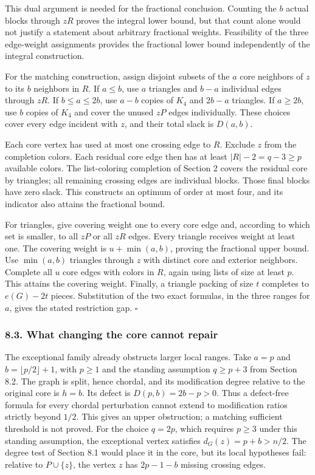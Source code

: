 \documentclass[english,11pt,a4paper]{article}
\begin{document}
This dual argument is needed for the fractional conclusion. Counting the
\(b\) actual blocks through \(zR\) proves the integral lower bound, but
that count alone would not justify a statement about arbitrary
fractional weights. Feasibility of the three edge-weight assignments
provides the fractional lower bound independently of the integral
construction.

For the matching construction, assign disjoint subsets of the \(a\) core
neighbors of \(z\) to its \(b\) neighbors in \(R\). If \(a\le b\), use
\(a\) triangles and \(b-a\) individual edges through \(zR\). If
\(b\le a\le2b\), use \(a-b\) copies of \(K_4\) and \(2b-a\) triangles.
If \(a\ge2b\), use \(b\) copies of \(K_4\) and cover the unused \(zP\)
edges individually. These choices cover every edge incident with \(z\),
and their total slack is \(D(a,b)\).

Each core vertex has used at most one crossing edge to \(R\). Exclude
\(z\) from the completion colors. Each residual core edge then has at
least \(|R|-2=q-3\ge p\) available colors. The list-coloring completion
of Section 2 covers the residual core by triangles; all remaining
crossing edges are individual blocks. Those final blocks have zero
slack. This constructs an optimum of order at most four, and its
indicator also attains the fractional bound.

For triangles, give covering weight one to every core edge and,
according to which set is smaller, to all \(zP\) or all \(zR\) edges.
Every triangle receives weight at least one. The covering weight is
\(u+\min(a,b)\), proving the fractional upper bound. Use \(\min(a,b)\)
triangles through \(z\) with distinct core and exterior neighbors.
Complete all \(u\) core edges with colors in \(R\), again using lists of
size at least \(p\). This attains the covering weight. Finally, a
triangle packing of size \(t\) completes to \(e(G)-2t\) pieces.
Substitution of the two exact formulas, in the three ranges for \(a\),
gives the stated restriction gap. \(\square\)

\subsubsection{8.3. What changing the core cannot
repair}\label{what-changing-the-core-cannot-repair}

The exceptional family already obstructs larger local ranges. Take
\(a=p\) and \(b=\lfloor p/2\rfloor+1\), with \(p\ge1\) and the standing
assumption \(q\ge p+3\) from Section 8.2. The graph is split, hence
chordal, and its modification degree relative to the original core is
\(h=b\). Its defect is \(D(p,b)=2b-p>0\). Thus a defect-free formula for
every chordal perturbation cannot extend to modification ratios strictly
beyond \(1/2\). This gives an upper obstruction; a matching sufficient
threshold is not proved. For the choice \(q=2p\), which requires
\(p\ge3\) under this standing assumption, the exceptional vertex
satisfies \(d_G(z)=p+b>n/2\). The degree test of Section 8.1 would place
it in the core, but its local hypotheses fail: relative to
\(P\cup\{z\}\), the vertex \(z\) has \(2p-1-b\) missing crossing edges.
\end{document}
